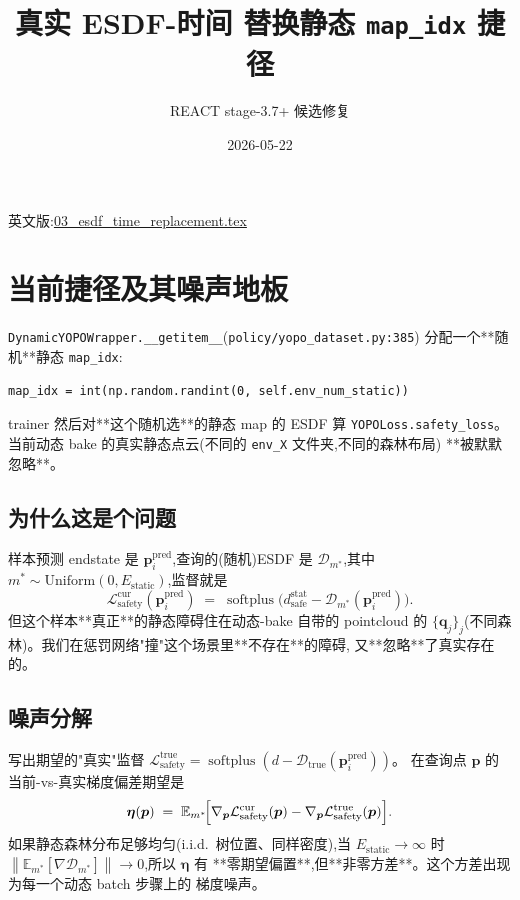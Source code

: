 \documentclass[UTF8, 11pt]{ctexart}
\title{真实 ESDF-时间 替换静态 \texttt{map\_idx} 捷径}
\author{REACT stage-3.7+ 候选修复}
\date{2026-05-22}
\newcommand{\Norm}[1]{\left\lVert #1 \right\rVert}
\newcommand{\esdf}{\mathcal{D}}
\newcommand{\softplus}{\operatorname{softplus}}
\begin{document}
\maketitle

英文版:\href{run:./03_esdf_time_replacement.tex}{03\_esdf\_time\_replacement.tex}

\section{当前捷径及其噪声地板}

\texttt{DynamicYOPOWrapper.\_\_getitem\_\_}(\texttt{policy/yopo\_dataset.py:385})
分配一个**随机**静态 \texttt{map\_idx}:
\begin{verbatim}
map_idx = int(np.random.randint(0, self.env_num_static))
\end{verbatim}

trainer 然后对**这个随机选**的静态 map 的 ESDF 算 \texttt{YOPOLoss.safety\_loss}。
当前动态 bake 的真实静态点云(不同的 \texttt{env\_X} 文件夹,不同的森林布局)
**被默默忽略**。

\subsection{为什么这是个问题}

样本预测 endstate 是 $\bm{p}_i^{\text{pred}}$,查询的(随机)ESDF 是
$\esdf_{m^*}$,其中 $m^* \sim \mathrm{Uniform}(0, E_{\text{static}})$,监督就是
\begin{equation}\label{eq:safety-current}
\mathcal{L}_{\text{safety}}^{\text{cur}}(\bm{p}_i^{\text{pred}})
\;=\;
\softplus\bigl(d_{\text{safe}}^{\text{stat}} - \esdf_{m^*}(\bm{p}_i^{\text{pred}})\bigr).
\end{equation}
但这个样本**真正**的静态障碍住在动态-bake 自带的 pointcloud 的
$\{\bm{q}_j\}_{j}$(不同森林)。我们在惩罚网络"撞"这个场景里**不存在**的障碍,
又**忽略**了真实存在的。

\subsection{噪声分解}

写出期望的"真实"监督
$\mathcal{L}_{\text{safety}}^{\text{true}} = \softplus(d - \esdf_{\text{true}}(\bm{p}_i^{\text{pred}}))$。
在查询点 $\bm{p}$ 的当前-vs-真实梯度偏差期望是
\begin{equation}\label{eq:mismatch}
\bm{\eta}(\bm{p})
\;=\;
\mathbb{E}_{m^*}\!\Bigl[
   \nabla_{\bm{p}} \mathcal{L}_{\text{safety}}^{\text{cur}}(\bm{p}) -
   \nabla_{\bm{p}} \mathcal{L}_{\text{safety}}^{\text{true}}(\bm{p})
\Bigr].
\end{equation}
如果静态森林分布足够均匀(i.i.d.\ 树位置、同样密度),当 $E_{\text{static}} \to \infty$
时 $\Norm{\mathbb{E}_{m^*}[\nabla \esdf_{m^*}]} \to 0$,所以 $\bm{\eta}$ 有
**零期望偏置**,但**非零方差**。这个方差出现为每一个动态 batch 步骤上的
梯度噪声。
\end{document}
